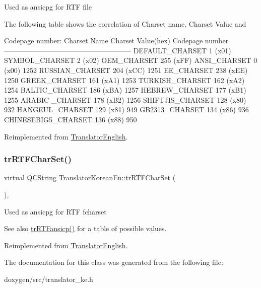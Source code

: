 Used as ansicpg for R\+TF file

The following table shows the correlation of Charset name, Charset Value and 
\begin{DoxyPre}
Codepage number:
Charset Name       Charset Value(hex)  Codepage number
------------------------------------------------------
DEFAULT\_CHARSET           1 (x01)
SYMBOL\_CHARSET            2 (x02)
OEM\_CHARSET             255 (xFF)
ANSI\_CHARSET              0 (x00)            1252
RUSSIAN\_CHARSET         204 (xCC)            1251
EE\_CHARSET              238 (xEE)            1250
GREEK\_CHARSET           161 (xA1)            1253
TURKISH\_CHARSET         162 (xA2)            1254
BALTIC\_CHARSET          186 (xBA)            1257
HEBREW\_CHARSET          177 (xB1)            1255
ARABIC \_CHARSET         178 (xB2)            1256
SHIFTJIS\_CHARSET        128 (x80)             932
HANGEUL\_CHARSET         129 (x81)             949
GB2313\_CHARSET          134 (x86)             936
CHINESEBIG5\_CHARSET     136 (x88)             950
\end{DoxyPre}
 

Reimplemented from \mbox{\hyperlink{class_translator_english_a58d43df9c7e82cf874f2d0ac64547a3a}{Translator\+English}}.

\mbox{\label{class_translator_korean_en_ad0ac561385e4e2583eb5f3aaf5303f4d}} 
\subsubsection{\texorpdfstring{trRTFCharSet()}{trRTFCharSet()}}
{\footnotesize\ttfamily virtual \mbox{\hyperlink{class_q_c_string}{Q\+C\+String}} Translator\+Korean\+En\+::tr\+R\+T\+F\+Char\+Set (\begin{DoxyParamCaption}{ }\end{DoxyParamCaption})\hspace{0.3cm}{\ttfamily [inline]}, {\ttfamily [virtual]}}

Used as ansicpg for R\+TF fcharset \begin{DoxySeeAlso}{See also}
\mbox{\hyperlink{class_translator_korean_en_ac60d57743cc1cd0a7b6bc6c57a445b7e}{tr\+R\+T\+Fansicp()}} for a table of possible values. 
\end{DoxySeeAlso}


Reimplemented from \mbox{\hyperlink{class_translator_english_a5c66e7339c73f03d5cae6291c21b98b8}{Translator\+English}}.



The documentation for this class was generated from the following file\+:\begin{DoxyCompactItemize}
\item 
doxygen/src/translator\+\_\+ke.\+h\end{DoxyCompactItemize}
